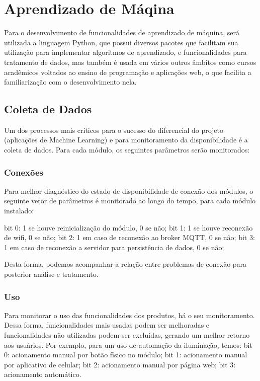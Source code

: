 \chapter{Aprendizado de Máqina}

Para o desenvolvimento de funcionalidades de aprendizado de máquina, será utilizada a linguagem Python, que possui diversos pacotes que facilitam sua utilização para implementar algoritmos de aprendizado, e funcionalidades para tratamento de dados, mas também é usada em vários outros âmbitos como cursos acadêmicos voltados ao ensino de programação e aplicações web, o que facilita a familiarização com o desenvolvimento nela.

\section{Coleta de Dados}
Um dos processos mais críticos para o sucesso do diferencial do projeto (aplicações de Machine Learning) e para monitoramento da disponibilidade é a coleta de dados. Para cada módulo, os seguintes parâmetros serão monitorados:

\subsection{Conexões}
Para melhor diagnóstico do estado de disponibilidade de conexão dos módulos, o seguinte vetor de parâmetros é monitorado ao longo do tempo, para cada módulo instalado:

bit 0: 1 se houve reinicialização do módulo, 0 se não;
bit 1: 1 se houve reconexão de wifi, 0 se não;
bit 2: 1 em caso de reconexão ao broker MQTT, 0 se não;
bit 3: 1 em caso de reconexão a servidor para persistência de dados, 0 se não;

Desta forma, podemos acompanhar a relação entre problemas de conexão para posterior análise e tratamento.

\subsection{Uso}
Para monitorar o uso das funcionalidades dos produtos, há o seu monitoramento. Dessa forma, funcionalidades mais usadas podem ser melhoradas e funcionalidades não utilizadas podem ser excluídas, gerando um melhor retorno aos usuários.
	Por exemplo, para um uso de automação da iluminação, temos:
bit 0: acionamento manual por botão físico no módulo;
bit 1: acionamento manual por aplicativo de celular;
bit 2: acionamento manual por página web;
bit 3: acionamento automático.
